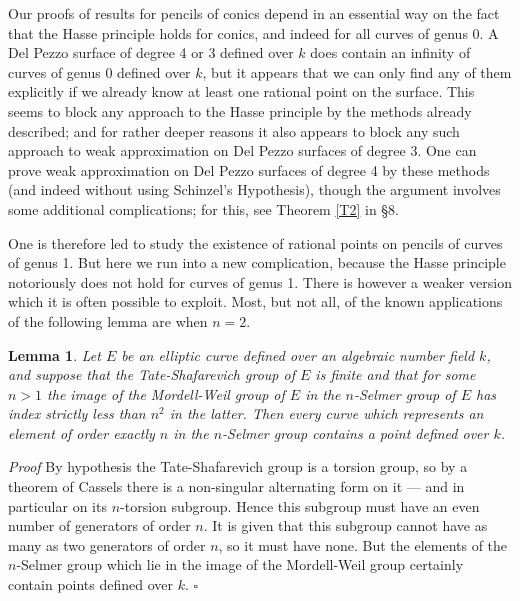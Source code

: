 \documentclass[12pt]{article}
\def\qed{{\hfill$\square$}}
\def\ble{\begin{lemma} \label}
\def\ele{\end{lemma}}
\newtheorem{lemma}{Lemma}
\begin{document}
Our proofs of results for pencils of conics depend in an essential way on the
fact that the Hasse principle holds for conics, and indeed for all curves of
genus 0. A Del Pezzo surface of degree 4 or 3 defined over $k$
does contain an infinity of curves of genus 0 defined over $k$, but it appears
that we can only find any of them explicitly if we already know at least one
rational point on the surface. This seems to block any
approach to the Hasse principle by the methods already
described; and for
rather deeper reasons it also appears to block any such approach to weak
approximation on Del Pezzo surfaces of degree 3. One can prove weak
approximation on Del Pezzo surfaces of degree 4 by these
methods (and indeed without using
Schinzel's Hypothesis), though the argument involves some additional
complications; for this, see Theorem \ref{T2} in \S8.

One is therefore led to study the existence of rational
points on pencils of curves
of genus 1. But here we run into a new complication, because the Hasse
principle notoriously does not hold for curves of genus 1. There is however a
weaker version which it is often possible to exploit. Most, but not all, of
the known applications of the following lemma are when $n=2$.
\ble{L9} Let $E$ be an elliptic curve defined over an algebraic number field
$k$, and suppose that the Tate-Shafarevich group of $E$ is finite and that
for some $n>1$ the image of the Mordell-Weil group of $E$ in the $n$-Selmer
group of $E$ has index strictly less than $n^2$ in the latter. Then every
curve which represents an element of order exactly $n$ in the $n$-Selmer group
contains a point defined over $k$.
\ele
\emph{Proof} 
By hypothesis the Tate-Shafarevich group is a torsion group, so by a theorem
of Cassels there is a non-singular alternating form on it
--- and in
particular on its $n$-torsion subgroup. Hence this subgroup must have an even
number of generators of order $n$. It is given that
this subgroup cannot have as many as two
generators of order $n$, so it must have none. 
But the elements of the $n$-Selmer group which lie in the image of the
Mordell-Weil group certainly contain points defined over $k$.  \qed
\end{document}
